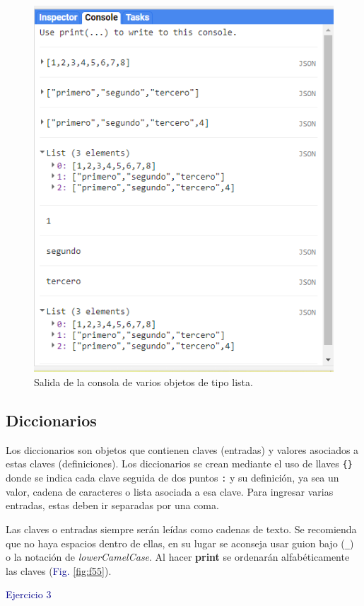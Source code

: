 \documentclass[
  12pt,
  letterpaper,
  twoside]{book}
\newcommand\boldpurple[1]{\textcolor{darkpurple}{\textbf{#1}}}
\begin{document}
\begin{figure}[H]

{\centering \includegraphics[width=0.6\linewidth]{Img/ej2} 

}

\caption{Salida de la consola de varios objetos de tipo lista.}\label{fig:f54}
\end{figure}

\hypertarget{diccionarios}{%
\subsection*{Diccionarios}\label{diccionarios}}

Los diccionarios son objetos que contienen claves (entradas) y valores asociados a estas claves (definiciones). Los diccionarios se crean mediante el uso de llaves \texttt{\{\}} donde se indica cada clave seguida de dos puntos \texttt{:} y su definición, ya sea un valor, cadena de caracteres o lista asociada a esa clave. Para ingresar varias entradas, estas deben ir separadas por una coma.

Las claves o entradas siempre serán leídas como cadenas de texto. Se recomienda que no haya espacios dentro de ellas, en su lugar se aconseja usar guion bajo (\texttt{\_}) o la notación de \emph{lowerCamelCase}. Al hacer \boldpurple{print} se ordenarán alfabéticamente las claves (\textcolor{darkblue}{Fig.} \ref{fig:f55}).

\textcolor{darkblue}{Ejercicio 3}
\end{document}
